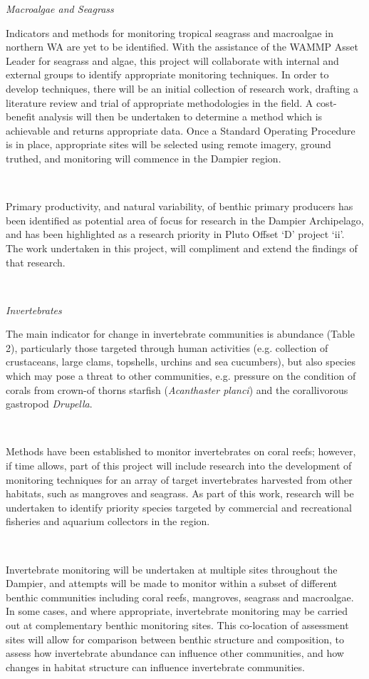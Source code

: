 \documentclass[version=last,
    paper=a4,                               %
    10pt,                                   %
    dvipsnames,
    oneside,                              %
    headings=openany,                       %
    open=any,
    BCOR=7mm,                               %
    DIV=15,     %
]{scrbook}
\begin{document}
\emph{Macroalgae and Seagrass}

Indicators and methods for monitoring tropical seagrass and macroalgae
in northern WA are yet to be identified. With the assistance of the
WAMMP Asset Leader for seagrass and algae, this project will collaborate
with internal and external groups to identify appropriate monitoring
techniques. In order to develop techniques, there will be an initial
collection of research work, drafting a literature review and trial of
appropriate methodologies in the field. A cost-benefit analysis will
then be undertaken to determine a method which is achievable and returns
appropriate data. Once a Standard Operating Procedure is in place,
appropriate sites will be selected using remote imagery, ground truthed,
and monitoring will commence in the Dampier region.

~

Primary productivity, and natural variability, of benthic primary
producers has been identified as potential area of focus for research in
the Dampier Archipelago, and has been highlighted as a research priority
in Pluto Offset `D' project `ii'. The work undertaken in this project,
will compliment and extend the findings of that research.

~

\emph{Invertebrates}

The main indicator for change in invertebrate communities is abundance
(Table 2), particularly those targeted through human activities (e.g.
collection of crustaceans, large clams, topshells, urchins and sea
cucumbers), but also species which may pose a threat to other
communities, e.g. pressure on the condition of corals from crown-of
thorns starfish (\emph{Acanthaster planci}) and the corallivorous
gastropod \emph{Drupella}.

~

Methods have been established to monitor invertebrates on coral reefs;
however, if time allows, part of this project will include research into
the development of monitoring techniques for an array of target
invertebrates harvested from other habitats, such as mangroves and
seagrass. As part of this work, research will be undertaken to identify
priority species targeted by commercial and recreational fisheries and
aquarium collectors in the region.

~

Invertebrate monitoring will be undertaken at multiple sites throughout
the Dampier, and attempts will be made to monitor within a subset of
different benthic communities including coral reefs, mangroves, seagrass
and macroalgae. In some cases, and where appropriate, invertebrate
monitoring may be carried out at complementary benthic monitoring sites.
This co-location of assessment sites will allow for comparison between
benthic structure and composition, to assess how invertebrate abundance
can influence other communities, and how changes in habitat structure
can influence invertebrate communities.
\end{document}
